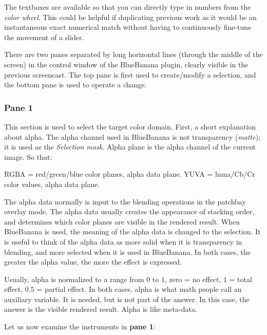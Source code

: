 The textboxes are available so that you can directly type in numbers from the \textit{color wheel}. This could be helpful if duplicating previous work as it would be an instantaneous exact numerical match without having to continuously fine-tune the movement of a slider.

There are two panes separated by long horizontal lines (through the middle of the screen) in the control window of the BlueBanana plugin, clearly visible in the previous screencast. The top pane is first used to create/modify a selection, and the bottom pane is used to operate a change.

\subsubsection*{Pane 1}
\label{ssub:pane1}

This section is used to select the target color domain. First, a short explanation about alpha. The alpha channel used in BlueBanana is not transparency (\textit{matte}); it is used as the \textit{Selection mask}. Alpha plane is the alpha channel of the current image. So that:

RGBA = red/green/blue color planes, alpha data plane.
YUVA = luma/Cb/Cr color values, alpha data plane.

The alpha data normally is input to the blending operations in the patchbay overlay mode. The alpha data usually creates the appearance of stacking order, and determines which color planes are visible in the rendered result. When BlueBanana is used, the meaning of the alpha data is changed to the selection. It is useful to think of the alpha data as more solid when it is transparency in blending, and more selected when it is used in BlueBanana. In both cases, the greater the alpha value, the more the effect is expressed.

Usually, alpha is normalized to a range from $0$ to $1$, zero = no effect, $1$ = total effect, $0.5$ = partial effect. In both cases, alpha is what math people call an auxiliary variable. It is needed, but is not part of the answer. In this case, the answer is the visible rendered result. Alpha is like meta-data.

Let us now examine the instruments in \textbf{pane 1}:

